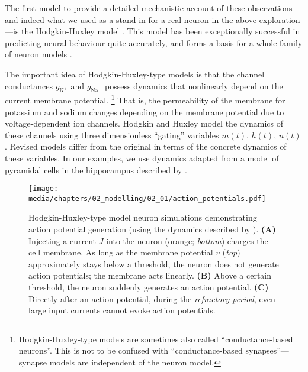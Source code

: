 \vspace*{-0.25em}
The first model to provide a detailed mechanistic account of these observations---and indeed what we used as a stand-in for a real neuron in the above exploration---is the Hodgkin-Huxley model \citep{hodgkin1952quantitative}.
This model has been exceptionally successful in predicting neural behaviour quite accurately, and forms a basis for a whole family of neuron models \citep{meunier2002playing,mccormick2007hodgkin}.

The important idea of Hodgkin-Huxley-type models is that the channel conductances $g_\mathrm{K^+}$ and $g_\mathrm{Na^+}$ possess dynamics that nonlinearly depend on the current membrane potential.%
\footnote{Hodgkin-Huxley-type models are sometimes also called \enquote{conductance-based neurons}. This is not to be confused with \enquote{conductance-based synapses}---synapse models are independent of the neuron model.}
That is, the permeability of the membrane for potassium and sodium changes depending on the membrane potential due to voltage-dependent ion channels.
Hodgkin and Huxley model the dynamics of these channels using three dimensionless \enquote{gating} variables $m(t)$, $h(t)$, $n(t)$.
Revised models differ from the original in terms of the concrete dynamics of these variables.
In our examples, we use dynamics adapted from a model of pyramidal cells in the hippocampus described by \citet[Chapter~4, pp.~92-94]{traub1991neuronal}.

\begin{figure}[p]
	\texttt{[image: media/chapters/02\_modelling/02\_01/action\_potentials.pdf]}
	{\label{fig:action_potentials_subthreshold}}
	{\label{fig:action_potentials_superthreshold}}
	{\label{fig:action_potentials_refractory}}
	\caption[Hodgkin-Huxley-type model neuron simulations demonstrating action potential generation]{Hodgkin-Huxley-type model neuron simulations demonstrating action potential generation (using the dynamics described by \cite{traub1991neuronal}).
	\textbf{(A)} Injecting a current $J$ into the neuron (orange; \emph{bottom}) charges the cell membrane. As long as the membrane potential $v$ (\emph{top}) approximately stays below a threshold, the neuron does not generate action potentials; the membrane acts linearly. \textbf{(B)} Above a certain threshold, the neuron suddenly generates an action potential. \textbf{(C)} Directly after an action potential, during the \emph{refractory period}, even large input currents cannot evoke action potentials.}
\end{figure}

